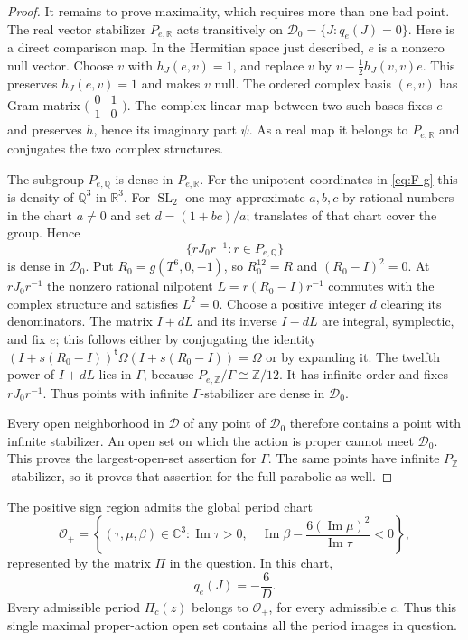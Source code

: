 \begin{proof}
It remains to prove maximality, which requires more than one bad point.
The real vector stabilizer $P_{e,\mathbb R}$ acts transitively on
$\mathcal D_0=\{J:q_e(J)=0\}$.  Here is a direct comparison map.  In the
Hermitian space just described, $e$ is a nonzero null vector.  Choose
$v$ with $h_J(e,v)=1$, and replace $v$ by
$v-\tfrac12h_J(v,v)e$.  This preserves $h_J(e,v)=1$ and makes $v$ null.
The ordered complex basis $(e,v)$ has Gram matrix
$\bigl(\begin{smallmatrix}0&1\\1&0\end{smallmatrix}\bigr)$.
The complex-linear map between two such bases fixes $e$ and preserves
$h$, hence its imaginary part $\psi$.  As a real map it belongs to
$P_{e,\mathbb R}$ and conjugates the two complex structures.

The subgroup $P_{e,\mathbb Q}$ is dense in $P_{e,\mathbb R}$.
For the unipotent coordinates in \eqref{eq:F-g} this is density of
$\mathbb Q^3$ in $\mathbb R^3$.  For $\operatorname{SL}_2$ one may
approximate $a,b,c$ by rational numbers in the chart $a\ne0$ and set
$d=(1+bc)/a$; translates of that chart cover the group.  Hence
\[
 \{rJ_0r^{-1}:r\in P_{e,\mathbb Q}\}
\]
is dense in $\mathcal D_0$.
Put $R_0=g(T^6,0,-1)$, so $R_0^{12}=R$ and
$(R_0-I)^2=0$.  At $rJ_0r^{-1}$ the nonzero rational nilpotent
$L=r(R_0-I)r^{-1}$ commutes with the complex structure and satisfies
$L^2=0$.  Choose a positive integer $d$ clearing its denominators.
The matrix $I+dL$ and its inverse $I-dL$ are integral, symplectic, and
fix $e$; this follows either by conjugating the identity
$(I+s(R_0-I))^{\mathsf t}\Omega(I+s(R_0-I))=\Omega$ or by expanding it.
The twelfth power of $I+dL$ lies in $\Gamma$, because
$P_{e,\mathbb Z}/\Gamma\cong\mathbb Z/12$.  It has infinite order and
fixes $rJ_0r^{-1}$.  Thus points with infinite $\Gamma$-stabilizer are
dense in $\mathcal D_0$.

Every open neighborhood in $\mathcal D$ of any point of $\mathcal D_0$
therefore contains a point with infinite stabilizer.  An open set on
which the action is proper cannot meet $\mathcal D_0$.  This proves the
largest-open-set assertion for $\Gamma$.  The same points have infinite
$P_{\mathbb Z}$-stabilizer, so it proves that assertion for the full
parabolic as well.
\end{proof}

\begin{proposition}[F.2.3; Proved]\label{st:F.2.3}
The positive sign region admits the global period chart
\[
 \mathcal O_+=\left\{
 (\tau,\mu,\beta)\in\mathbb C^3:
 \operatorname{Im}\tau>0,\quad
 \operatorname{Im}\beta-\frac{6(\operatorname{Im}\mu)^2}
 {\operatorname{Im}\tau}<0\right\},
\]
represented by the matrix $\Pi$ in the question.  In this chart,
\begin{equation}\label{eq:F-qD}
 q_e(J)=-\frac6D.
\end{equation}
Every admissible period $\Pi_c(z)$ belongs to $\mathcal O_+$, for every
admissible $c$.  Thus this single maximal proper-action open set contains
all the period images in question.
\end{proposition}

